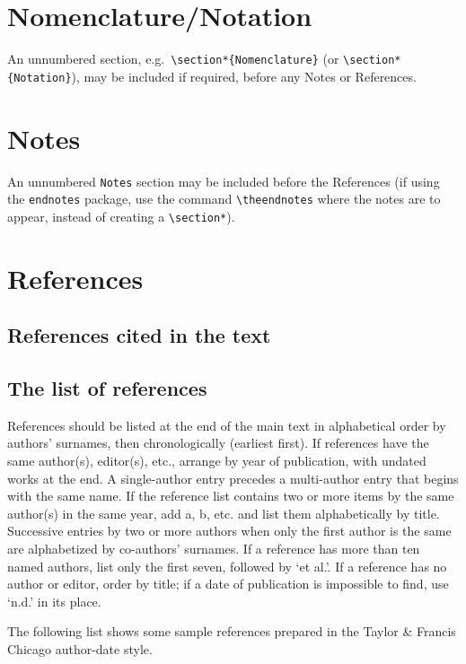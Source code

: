 \documentclass[]{interact}
\theoremstyle{plain}%
\theoremstyle{definition}
\theoremstyle{remark}
\begin{document}
\hypertarget{nomenclaturenotation}{%
\section*{Nomenclature/Notation}\label{nomenclaturenotation}}

An unnumbered section,
e.g.~\texttt{\textbackslash{}section*\{Nomenclature\}} (or
\texttt{\textbackslash{}section*\{Notation\}}), may be included if
required, before any Notes or References.

\hypertarget{notes}{%
\section*{Notes}\label{notes}}

An unnumbered \texttt{Notes} section may be included before the
References (if using the \texttt{endnotes} package, use the command
\texttt{\textbackslash{}theendnotes} where the notes are to appear,
instead of creating a \texttt{\textbackslash{}section*}).

\hypertarget{references}{%
\section{References}\label{references}}

\hypertarget{references-cited-in-the-text}{%
\subsection{References cited in the
text}\label{references-cited-in-the-text}}

\hypertarget{the-list-of-references}{%
\subsection{The list of references}\label{the-list-of-references}}

References should be listed at the end of the main text in alphabetical
order by authors' surnames, then chronologically (earliest first). If
references have the same author(s), editor(s), etc., arrange by year of
publication, with undated works at the end. A single-author entry
precedes a multi-author entry that begins with the same name. If the
reference list contains two or more items by the same author(s) in the
same year, add a, b, etc. and list them alphabetically by title.
Successive entries by two or more authors when only the first author is
the same are alphabetized by co-authors' surnames. If a reference has
more than ten named authors, list only the first seven, followed by `et
al.'. If a reference has no author or editor, order by title; if a date
of publication is impossible to find, use `n.d.' in its place.

The following list shows some sample references prepared in the Taylor
\& Francis Chicago author-date style.

\citep{Ade09, Alb05}



\end{document}

